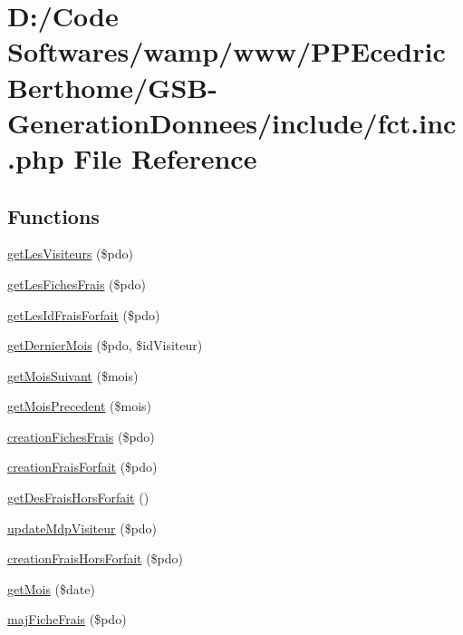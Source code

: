 \hypertarget{_g_s_b-_generation_donnees_2include_2fct_8inc_8php}{}\section{D\+:/\+Code Softwares/wamp/www/\+P\+P\+Ecedric\+Berthome/\+G\+S\+B-\/\+Generation\+Donnees/include/fct.inc.\+php File Reference}
\label{_g_s_b-_generation_donnees_2include_2fct_8inc_8php}
\subsection*{Functions}
\begin{DoxyCompactItemize}
\item 
\hyperlink{_g_s_b-_generation_donnees_2include_2fct_8inc_8php_a2acfd2dba761253597a1ab45974a0960}{get\+Les\+Visiteurs} (\$pdo)
\item 
\hyperlink{_g_s_b-_generation_donnees_2include_2fct_8inc_8php_a4ddda167f959ca116a8a3e6eeb90fa9e}{get\+Les\+Fiches\+Frais} (\$pdo)
\item 
\hyperlink{_g_s_b-_generation_donnees_2include_2fct_8inc_8php_a6308942d3ba830a09e7e94ae7711e484}{get\+Les\+Id\+Frais\+Forfait} (\$pdo)
\item 
\hyperlink{_g_s_b-_generation_donnees_2include_2fct_8inc_8php_a24de2eaeae5f67c359ec963e032dc070}{get\+Dernier\+Mois} (\$pdo, \$id\+Visiteur)
\item 
\hyperlink{_g_s_b-_generation_donnees_2include_2fct_8inc_8php_a645aa8a245cbeb2d0d167fcc942b9b5c}{get\+Mois\+Suivant} (\$mois)
\item 
\hyperlink{_g_s_b-_generation_donnees_2include_2fct_8inc_8php_aeeb91507878426d6313448a6bd1cad7c}{get\+Mois\+Precedent} (\$mois)
\item 
\hyperlink{_g_s_b-_generation_donnees_2include_2fct_8inc_8php_aaa271411c3446ad3c57a1429136fc1bf}{creation\+Fiches\+Frais} (\$pdo)
\item 
\hyperlink{_g_s_b-_generation_donnees_2include_2fct_8inc_8php_a15cec1f321241d0de7115e96cfccf67f}{creation\+Frais\+Forfait} (\$pdo)
\item 
\hyperlink{_g_s_b-_generation_donnees_2include_2fct_8inc_8php_ae0eddc9c28d0ed7a68aa28fa98a6f214}{get\+Des\+Frais\+Hors\+Forfait} ()
\item 
\hyperlink{_g_s_b-_generation_donnees_2include_2fct_8inc_8php_ad1a28b1457da19e4210dfa8869d1c874}{update\+Mdp\+Visiteur} (\$pdo)
\item 
\hyperlink{_g_s_b-_generation_donnees_2include_2fct_8inc_8php_ad980a8fa84e6aee8092ec6525bf1cd5a}{creation\+Frais\+Hors\+Forfait} (\$pdo)
\item 
\hyperlink{_g_s_b-_generation_donnees_2include_2fct_8inc_8php_ac6b26dbc90d7a5ec71b0585ee0786a41}{get\+Mois} (\$date)
\item 
\hyperlink{_g_s_b-_generation_donnees_2include_2fct_8inc_8php_a737fc7684b15055a48683ee1f6683b5b}{maj\+Fiche\+Frais} (\$pdo)
\end{DoxyCompactItemize}


